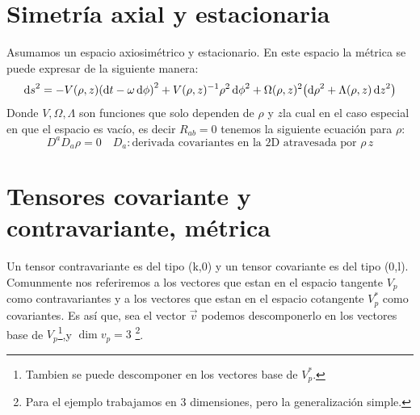 \documentclass[../Main.tex]{subfiles}
\begin{document}
\renewcommand{\thesection}{A\arabic{section}}
\renewcommand{\thetable}{A\arabic{section}.\arabic{table}}




\section{Simetría axial y estacionaria}

Asumamos un espacio axiosimétrico y estacionario. En este espacio la métrica se puede expresar de la siguiente manera:
%
\begin{equation}
\dd{s}^{2} = -V(\rho, z)\qty(\dd{t}-\omega\dd{\phi})^{2}+V(\rho, z)^{-1}\rho^{2}\dd{\phi}^{2}+\Omega(\rho, z)^{2}\qty(\dd{\rho}^{2}+\Lambda(\rho, z)\dd{z}^{2})
\end{equation}
%
Donde $V,\Omega, \Lambda$ son funciones que solo dependen de $\rho$ y $z$la cual en el caso especial en que el espacio es vacío, es decir $R_{ab}=0$ tenemos la siguiente ecuación para $\rho$:
%
\begin{equation}
    D^{a}D_{a}\rho=0 \quad D_{a}: \text{derivada covariantes en la 2D atravesada por } \rho \, z
\end{equation}
%

\section{Tensores covariante y contravariante, métrica}\label{sec:tensores}
Un tensor contravariante es del tipo (k,0) y un tensor covariante es del tipo (0,l). Comunmente nos referiremos a los vectores que estan en el espacio tangente $V_{p}$ como contravariantes y a los vectores que estan en el espacio cotangente $V^{*}_{p}$ como covariantes. Es así que, sea el vector $\vec{v}$ podemos descomponerlo en los vectores base de $V_{p}$\footnote{Tambien se puede descomponer en los vectores base de $V^{*}_{p}$.},y $\dim{v_{p}}=3$ \footnote{Para el ejemplo trabajamos en 3 dimensiones, pero la generalización simple.}.
\end{document}
